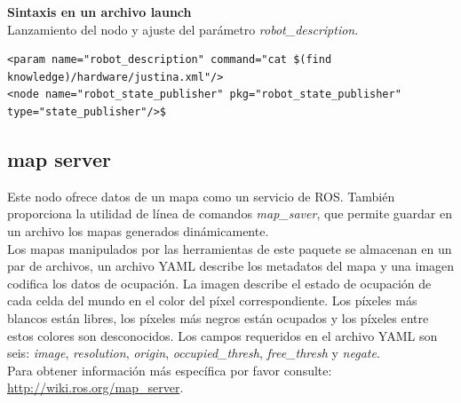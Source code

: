 \documentclass[a4paper,usenames,dvipsnames,svgnames,table]{book}
\begin{document}
\textbf{Sintaxis en un archivo launch}\\
Lanzamiento del nodo y ajuste del parámetro \textit{robot\_description}.
\begin{verbatim}
<param name="robot_description" command="cat $(find knowledge)/hardware/justina.xml"/>
<node name="robot_state_publisher" pkg="robot_state_publisher" type="state_publisher"/>$
\end{verbatim}

\subsection{map server}
Este nodo ofrece datos de un mapa como un servicio de ROS. También proporciona la utilidad de línea de comandos \textit{map\_saver}, que permite guardar en un archivo los mapas generados dinámicamente.\\

Los mapas manipulados por las herramientas de este paquete se almacenan en un par de archivos, un archivo YAML describe los metadatos del mapa y una imagen codifica los datos de ocupación. La imagen describe el estado de ocupación de cada celda del mundo en el color del píxel correspondiente. Los píxeles más blancos están libres, los píxeles más negros están ocupados y los píxeles entre estos colores son desconocidos. Los campos requeridos en el archivo YAML son seis: \textit{image}, \textit{resolution}, \textit{origin}, \textit{occupied\_thresh}, \textit{free\_thresh} y \textit{negate}. \\

Para obtener información más específica por favor consulte: \url{http://wiki.ros.org/map_server}.\\
\end{document}
